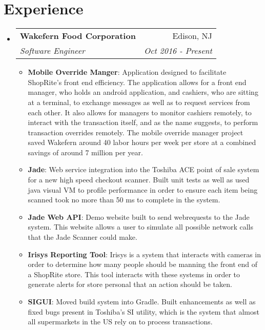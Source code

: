 \documentclass[letterpaper,11pt]{article}
\makeatletter
\newcommand{\resumeItem}[2]{
  \item\small{
    \textbf{#1}{: #2 \vspace{-2pt}}
  }
}
\newcommand{\resumeSubheading}[4]{
  \vspace{-1pt}\item
    \begin{tabular*}{0.97\textwidth}{l@{\extracolsep{\fill}}r}
      \textbf{#1} & #2 \\
      \textit{\small#3} & \textit{\small #4} \\
    \end{tabular*}\vspace{-5pt}
}
\newcommand{\resumeSubHeadingListStart}{\begin{itemize}[leftmargin=*]}
\newcommand{\resumeSubHeadingListEnd}{\end{itemize}}
\newcommand{\resumeItemListStart}{\begin{itemize}}
\newcommand{\resumeItemListEnd}{\end{itemize}\vspace{-5pt}}
\makeatother
\begin{document}
\section{Experience}
  \resumeSubHeadingListStart
    \resumeSubheading
      {Wakefern Food Corporation}{Edison, NJ}
      {Software Engineer}{Oct 2016 - Present}
      \resumeItemListStart
        \resumeItem{Mobile Override Manger}
          {Application designed to facilitate ShopRite's front end efficiency. The application allows for a front end manager, who holds an android application, and cashiers, who are sitting at a terminal, to exchange messages as well as to request services from each other. It also allows for managers to monitor cashiers remotely, to interact with the transaction itself, and as the name suggests, to perform transaction overrides remotely. The mobile override manager project saved Wakefern around 40 labor hours per week per store at a combined savings of around 7 million per year.}      
        \resumeItem{Jade}
          {Web service integration into the Toshiba ACE point of sale system for a new high speed checkout scanner. Built unit tests as well as used java visual VM to profile performance in order to ensure each item being scanned took no more than 50 ms to complete in the system.}
        \resumeItem{Jade Web API}
          {Demo website built to send webrequests to the Jade system. This website allows a user to simulate all possible network calls that the Jade Scanner could make.}          
        \resumeItem{Irisys Reporting Tool}
          {Irisys is a system that interacts with cameras in order to determine how many people should be manning the front end of a ShopRite store. This tool interacts with these systems in order to generate alerts for store personal that an action should be taken.}    
        \resumeItem{SIGUI}
          {Moved build system into Gradle. Built enhancements as well as fixed bugs present in Toshiba's SI utility, which is the system that almost all supermarkets in the US rely on to process transactions.}             
      \resumeItemListEnd

  \resumeSubHeadingListEnd


\end{document}
